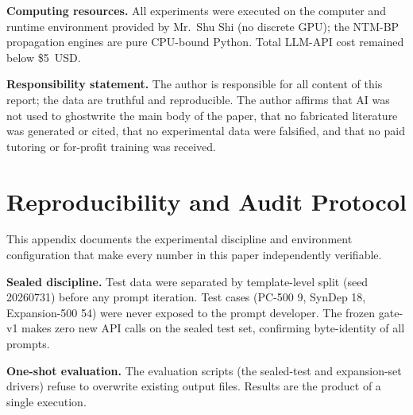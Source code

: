 \documentclass{article}
\theoremstyle{definition}
\begin{document}
\noindent\textbf{Computing resources.}
All experiments were executed on the computer and runtime environment
provided by Mr.~Shu Shi (no discrete GPU); the NTM-BP propagation engines
are pure CPU-bound Python. Total LLM-API cost remained below \$5~USD.

\noindent\textbf{Responsibility statement.}
The author is responsible for all content of this report; the data are
truthful and reproducible. The author affirms that AI was not used to
ghostwrite the main body of the paper, that no fabricated literature was
generated or cited, that no experimental data were falsified, and that no
paid tutoring or for-profit training was received.


\appendix


\section{Reproducibility and Audit Protocol}
\label{app:reproducibility}

This appendix documents the experimental discipline and environment
configuration that make every number in this paper independently
verifiable.

\textbf{Sealed discipline.}  Test data were separated by template-level
split (seed 20260731) before any prompt iteration.  Test cases
(PC-500 9, SynDep 18, Expansion-500 54) were never exposed to the
prompt developer.  The frozen gate-v1 makes zero new API calls on
the sealed test set, confirming byte-identity of all prompts.

\textbf{One-shot evaluation.}  The evaluation scripts (the sealed-test
and expansion-set drivers) refuse to overwrite
existing output files.  Results are the product of a single
execution.
\end{document}
